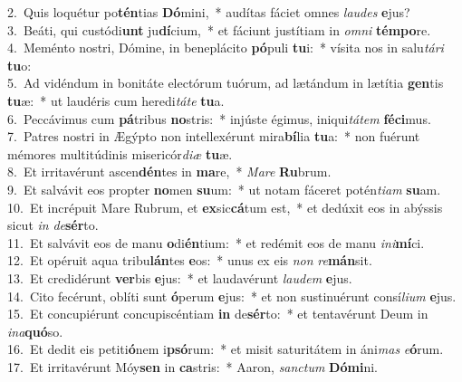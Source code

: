{2.~}Quis loquétur po\textbf{tén}tias \textbf{Dó}mini,~* audítas fáciet omnes \textit{lau}\textit{des} \textbf{e}jus?\\
{3.~}Beáti, qui custódi\textbf{unt} ju\textbf{dí}cium,~* et fáciunt justítiam in \textit{om}\textit{ni} \textbf{tém}\textbf{po}re.\\
{4.~}Meménto nostri, Dómine, in beneplácito \textbf{pó}puli \textbf{tu}i:~* vísita nos in salu\textit{tá}\textit{ri} \textbf{tu}o:\\
{5.~}Ad vidéndum in bonitáte electórum tuórum, ad lætándum in lætítia \textbf{gen}tis \textbf{tu}æ:~* ut laudéris cum heredi\textit{tá}\textit{te} \textbf{tu}a.\\
{6.~}Peccávimus cum \textbf{pá}tribus \textbf{no}stris:~* injúste égimus, iniqui\textit{tá}\textit{tem} \textbf{fé}\textbf{ci}mus.\\
{7.~}Patres nostri in Ægýpto non intellexérunt mira\textbf{bí}lia \textbf{tu}a:~* non fuérunt mémores multitúdinis misericór\textit{di}\textit{æ} \textbf{tu}æ.\\
{8.~}Et irritavérunt ascen\textbf{dén}tes in \textbf{ma}re,~* \textit{Ma}\textit{re} \textbf{Ru}brum.\\
{9.~}Et salvávit eos propter \textbf{no}men \textbf{su}um:~* ut notam fáceret potén\textit{ti}\textit{am} \textbf{su}am.\\
{10.~}Et incrépuit Mare Rubrum, et \textbf{ex}sic\textbf{cá}tum est,~* et dedúxit eos in abýssis sicut \textit{in} \textit{de}\textbf{sér}to.\\
{11.~}Et salvávit eos de manu \textbf{o}di\textbf{én}tium:~* et redémit eos de manu \textit{i}\textit{ni}\textbf{mí}ci.\\
{12.~}Et opéruit aqua tribu\textbf{lán}tes \textbf{e}os:~* unus ex eis \textit{non} \textit{re}\textbf{mán}sit.\\
{13.~}Et credidérunt \textbf{ver}bis \textbf{e}jus:~* et laudavérunt \textit{lau}\textit{dem} \textbf{e}jus.\\
{14.~}Cito fecérunt, oblíti sunt \textbf{ó}perum \textbf{e}jus:~* et non sustinuérunt consí\textit{li}\textit{um} \textbf{e}jus.\\
{15.~}Et concupiérunt concupiscéntiam \textbf{in} de\textbf{sér}to:~* et tentavérunt Deum in \textit{i}\textit{na}\textbf{quó}so.\\
{16.~}Et dedit eis petiti\textbf{ó}nem i\textbf{psó}rum:~* et misit saturitátem in áni\textit{mas} \textit{e}\textbf{ó}rum.\\
{17.~}Et irritavérunt Móy\textbf{sen} in \textbf{ca}stris:~* Aaron, \textit{san}\textit{ctum} \textbf{Dó}\textbf{mi}ni.\\
